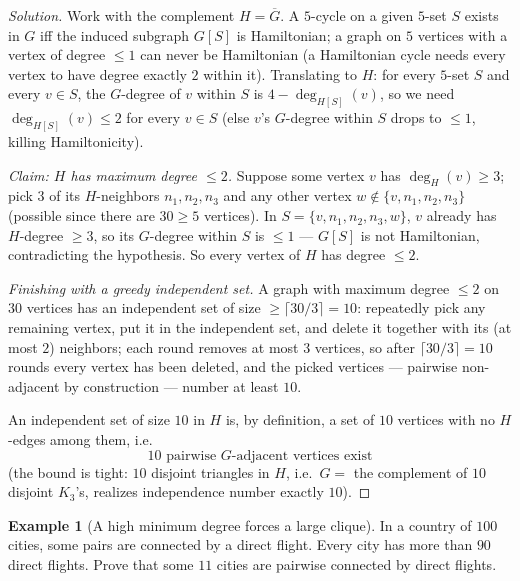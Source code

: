 \documentclass[11pt]{article}
\theoremstyle{definition}
\newtheorem{example}{Example}[section]
\begin{document}
\begin{proof}[Solution]
Work with the complement $H=\overline G$. A $5$-cycle on a given $5$-set $S$ exists in $G$ iff the induced subgraph $G[S]$ is Hamiltonian; a graph on $5$ vertices with a vertex of degree $\le1$ can never be Hamiltonian (a Hamiltonian cycle needs every vertex to have degree exactly $2$ within it). Translating to $H$: for every $5$-set $S$ and every $v\in S$, the $G$-degree of $v$ within $S$ is $4-\deg_{H[S]}(v)$, so we need $\deg_{H[S]}(v)\le2$ for every $v\in S$ (else $v$'s $G$-degree within $S$ drops to $\le1$, killing Hamiltonicity).

\emph{Claim: $H$ has maximum degree $\le2$.} Suppose some vertex $v$ has $\deg_H(v)\ge3$; pick $3$ of its $H$-neighbors $n_1,n_2,n_3$ and any other vertex $w\notin\{v,n_1,n_2,n_3\}$ (possible since there are $30\ge5$ vertices). In $S=\{v,n_1,n_2,n_3,w\}$, $v$ already has $H$-degree $\ge3$, so its $G$-degree within $S$ is $\le1$ — $G[S]$ is not Hamiltonian, contradicting the hypothesis. So every vertex of $H$ has degree $\le2$.

\emph{Finishing with a greedy independent set.} A graph with maximum degree $\le2$ on $30$ vertices has an independent set of size $\ge\lceil 30/3\rceil=10$: repeatedly pick any remaining vertex, put it in the independent set, and delete it together with its (at most $2$) neighbors; each round removes at most $3$ vertices, so after $\lceil30/3\rceil=10$ rounds every vertex has been deleted, and the picked vertices — pairwise non-adjacent by construction — number at least $10$.

An independent set of size $10$ in $H$ is, by definition, a set of $10$ vertices with no $H$-edges among them, i.e.\
\[
\boxed{10 \text{ pairwise } G\text{-adjacent vertices exist}}
\]
(the bound is tight: $10$ disjoint triangles in $H$, i.e.\ $G=$ the complement of $10$ disjoint $K_3$'s, realizes independence number exactly $10$).
\end{proof}

\begin{example}[A high minimum degree forces a large clique]
In a country of $100$ cities, some pairs are connected by a direct flight. Every city has more than $90$ direct flights. Prove that some $11$ cities are pairwise connected by direct flights.
\end{example}
\end{document}

